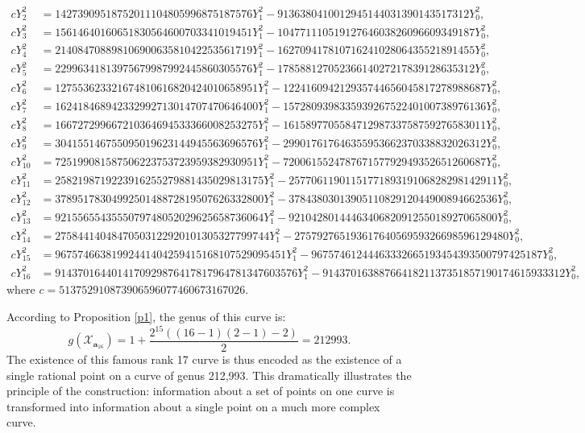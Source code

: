 \documentclass[11pt, a4paper]{amsart}
\theoremstyle{definition}
\newcommand{\Xc}{\mathcal{X}}
\newcommand{\ba}{\mathbf{a}}
\begin{document}
%
{\scriptsize
	\begin{align*}  
		c Y_2^2  & = 14273909518752011104805996875187576 Y_1^2 - 9136380410012945144031390143517312 Y_0^2,  \\
		c Y_3^2  & = 15614640160651830564600703341019451 Y_1^2 -10477111051912764603826096609349187 Y_0^2, \\
		c Y_4^2  & = 21408470889810690063581042253561719 Y_1^2 -16270941781071624102806435521891455 Y_0^2, \\
		c Y_5^2  & = 22996341813975679987992445860305576 Y_1^2 -17858812705236614027217839128635312 Y_0^2,\\
		c Y_6^2  & = 127553623321674810616820424010658951 Y_1^2 -122416094212935744656045817278988687 Y_0^2,\\
		c Y_7^2  & = 162418468942332992713014707470646400 Y_1^2 -157280939833593926752240100738976136 Y_0^2,\\
		c Y_8^2  & = 166727299667210364694533366008253275 Y_1^2 -161589770558471298733758759276583011 Y_0^2, \\
		c Y_9^2  & = 304155146755095019623144945563696576 Y_1^2 -299017617646355953662370338832026312 Y_0^2, \\
		c Y_{10}^2 & = 725199081587506223753723959382930951 Y_1^2 -720061552478767157792949352651260687 Y_0^2,\\
		c Y_{11}^2 & = 2582198719223916255279881435029813175 Y_1^2  -2577061190115177189319106828298142911 Y_0^2 , \\
		c Y_{12}^2 & = 3789517830499250148872819507626332800 Y_1^2 -3784380301390511082912044900894662536 Y_0^2,  \\
		c Y_{13}^2 & = 9215565543555079748052029625658736064 Y_1^2 -9210428014446340682091255018927065800 Y_0^2,\\
		c Y_{14}^2 & = 27584414048470503122920101305327799744 Y_1^2  -27579276519361764056959326698596129480 Y_0^2,\\
		c Y_{15}^2 & = 96757466381992441404259415168107529095451 Y_1^2 -96757461244463332665193454393500797425187 Y_0^2,\\
		c Y_{16}^2 & = 9143701644014170929876417817964781347603576 Y_1^2 -9143701638876641821137351857190174615933312 Y_0^2,
\end{align*}}
where $c=513752910873906596077460673167026$.

According to Proposition \ref{p1}, the genus of this  curve is:
\[ g(\Xc_{\ba_{16}}) = 1 + \frac{2^{15}((16-1)(2-1)-2)}{2} =   212993. \]
The existence of this famous rank 17 curve is thus encoded as the existence of a single rational point on a curve of genus 212,993. 
This dramatically illustrates the principle of the construction: information about a set of points on one curve is transformed into information about a single point on a much more complex curve.
\end{document}
